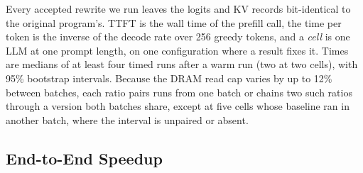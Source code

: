 Every accepted rewrite we run leaves the logits and KV records bit-identical to the original program's.
TTFT is the wall time of the prefill call, the time per token is the inverse of the decode rate over 256 greedy tokens, and a \emph{cell} is one LLM at one prompt length, on one configuration where a result fixes it.
Times are medians of at least four timed runs after a warm run (two at two cells), with 95\% bootstrap intervals.
Because the DRAM read cap varies by up to 12\% between batches, each ratio pairs runs from one batch or chains two such ratios through a version both batches share, except at five cells whose baseline ran in another batch, where the interval is unpaired or absent.

\subsection{End-to-End Speedup}
\label{subsec:e2e}

